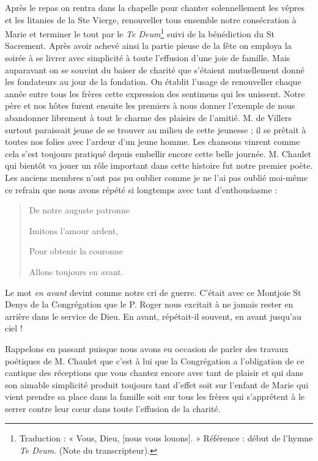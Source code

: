 Après le repas on rentra dans la chapelle pour chanter solennellement les vêpres et les litanies de la Ste Vierge, renouveller tous ensemble notre consécration à Marie et terminer le tout par le \textit{Te Deum}\footnote{Traduction : « Vous, Dieu, [nous vous louons]. » Référence : début de l’hymne \textit{Te Deum}. (Note du transcripteur).} suivi de la bénédiction du St Sacrement. Après avoir achevé ainsi la partie pieuse de la fête on employa la soirée à se livrer avec simplicité à toute l'effusion d'une joie de famille. Mais auparavant on se souvint du baiser de charité que s'étaient mutuellement donné les fondateurs au jour de la fondation. On établit l'usage de renouveller chaque année entre tous les frères cette expression des sentimens qui les unissent. Notre père et nos hôtes furent ensuite les premiers à nous donner l'exemple de nous abandonner librement à tout le charme des plaisirs de l'amitié. M. de Villers surtout paraissait jeune de se trouver au milieu de cette jeunesse ; il se prêtait à toutes nos folies avec l'ardeur d'un jeune homme. Les chansons vinrent comme cela s'est toujours pratiqué depuis embellir encore cette belle journée. M. Chaulet qui bientôt va jouer un rôle important dans cette histoire fut notre premier poète. Les anciens membres n'ont pas pu oublier comme je ne l'ai pas oublié moi-même ce refrain que nous avons répété si longtemps avec tant d'enthousiasme :
\begin{quote}
De notre auguste patronne\par
Imitons l'amour ardent,\par
Pour obtenir la couronne\par
Allons toujours en avant.
\end{quote}
Le mot \textit{en avant} devint comme notre cri de guerre. C'était avec ce Montjoie St Denys
de la Congrégation que le P. Roger nous excitait à ne jamais rester en arrière dans le service de Dieu. En avant, répétait-il souvent, en avant jusqu'au ciel !

Rappelons en passant puisque nous avons eu occasion de parler des travaux poétiques de M. Chaulet que c'est à lui que la Congrégation a l'obligation de ce cantique des réceptions que vous chantez encore avec tant de plaisir et qui dans son aimable simplicité produit toujours tant d'effet soit sur l'enfant de Marie qui vient prendre sa place dans la famille soit sur tous les frères qui s'apprêtent à le serrer contre leur cœur dans toute l'effusion de la charité.

